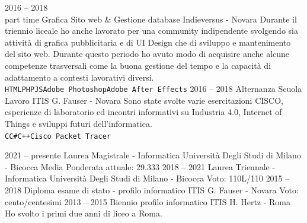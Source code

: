 \documentclass[9pt]{developercv} %
\begin{document}
\begin{entrylist}
	\entry
		{2016 -- 2018\\\footnotesize{part time}}
		{Grafica Sito web \& Gestione database}
		{Indieversus - Novara}
		{Durante il triennio liceale ho anche lavorato per una community indipendente svolgendo sia attività di grafica pubblicitaria e di UI Design che di sviluppo e mantenimento del sito web. Durante questo periodo ho avuto modo di acquisire anche alcune competenze trasversali come la buona gestione del tempo e la capacità di adattamento a contesti lavorativi diversi. \\ \texttt{HTML}\slashsep\texttt{PHP}\slashsep\texttt{JS}\slashsep\texttt{Adobe Photoshop}\slashsep\texttt{Adobe After Effects}}
	\entry
		{2016 -- 2018}
		{Alternanza Scuola Lavoro}
		{ITIS G. Fauser - Novara}
		{Sono state svolte varie esercitazioni CISCO, esperienze di laboratorio ed incontri informativi su Industria 4.0, Internet of Things e sviluppi futuri dell'informatica. \\ \texttt{C}\slashsep\texttt{C\#}\slashsep\texttt{C++}\slashsep\texttt{Cisco Packet Tracer}}
\end{entrylist}



\begin{entrylist}
	\entry
		{2021 -- presente}
		{Laurea Magistrale - Informatica}
		{Università Degli Studi di Milano - Bicocca}
		{Media Ponderata attuale: 29.333}
	\entry
		{2018 -- 2021}
		{Laurea Triennale - Informatica}
		{Università Degli Studi di Milano - Bicocca}
		{Voto: 110L/110}
	\entry
		{2015 -- 2018}
		{Diploma esame di stato - profilo informatico}
		{ITIS G. Fauser - Novara}
		{Voto: cento/centesimi}
	\entry
		{2013 -- 2015}
		{Biennio profilo informatico}
		{ITIS H. Hertz - Roma}
		{Ho svolto i primi due anni di liceo a Roma.}
\end{entrylist}

\end{document}
